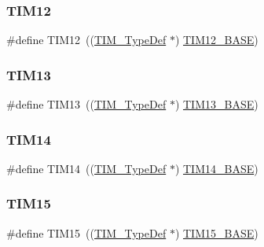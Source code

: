 \subsubsection{\texorpdfstring{TIM12}{TIM12}}
{\footnotesize\ttfamily \#define T\+I\+M12~((\mbox{\hyperlink{struct_t_i_m___type_def}{T\+I\+M\+\_\+\+Type\+Def}} $\ast$) \mbox{\hyperlink{group___peripheral__memory__map_ga33dea32fadbaecea161c2ef7927992fd}{T\+I\+M12\+\_\+\+B\+A\+SE}})}

\mbox{\label{group___peripheral__declaration_ga5a959a833074d59bf6cc7fb437c65b18}} 
\subsubsection{\texorpdfstring{TIM13}{TIM13}}
{\footnotesize\ttfamily \#define T\+I\+M13~((\mbox{\hyperlink{struct_t_i_m___type_def}{T\+I\+M\+\_\+\+Type\+Def}} $\ast$) \mbox{\hyperlink{group___peripheral__memory__map_gad20f79948e9359125a40bbf6ed063590}{T\+I\+M13\+\_\+\+B\+A\+SE}})}

\mbox{\label{group___peripheral__declaration_ga2dd30f46fad69dd73e1d8941a43daffe}} 
\subsubsection{\texorpdfstring{TIM14}{TIM14}}
{\footnotesize\ttfamily \#define T\+I\+M14~((\mbox{\hyperlink{struct_t_i_m___type_def}{T\+I\+M\+\_\+\+Type\+Def}} $\ast$) \mbox{\hyperlink{group___peripheral__memory__map_ga862855347d6e1d92730dfe17ee8e90b8}{T\+I\+M14\+\_\+\+B\+A\+SE}})}

\mbox{\label{group___peripheral__declaration_ga87e4b442041d1c03a6af113fbe04a182}} 
\subsubsection{\texorpdfstring{TIM15}{TIM15}}
{\footnotesize\ttfamily \#define T\+I\+M15~((\mbox{\hyperlink{struct_t_i_m___type_def}{T\+I\+M\+\_\+\+Type\+Def}} $\ast$) \mbox{\hyperlink{group___peripheral__memory__map_ga7ab42ce1846930569d742d339b554078}{T\+I\+M15\+\_\+\+B\+A\+SE}})}

